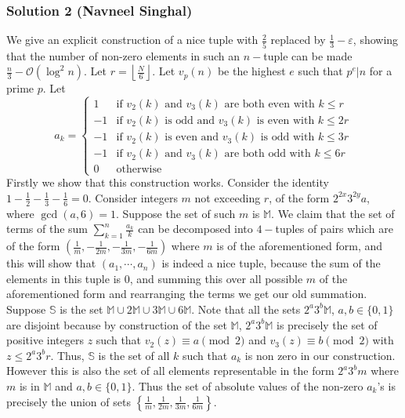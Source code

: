 \subsubsection{Solution 2 (Navneel Singhal)}
We give an explicit construction of a nice tuple with $\frac 25$ replaced by $\frac13 - \varepsilon$, showing that the number of non-zero elements in such an $n-$tuple can be made $\frac{n}{3} - \mathcal{O}(\log^2 n)$.
Let $r = \left\lfloor \frac{N}{6}\right\rfloor$. Let $v_p(n)$ be the highest $e$ such that $p^e | n$ for a prime $p$. Let
$$
a_k = 
\begin{cases}
    1 & \text{if } v_2(k) \text{ and } v_3(k) \text{ are both even with } k \le r\\
    -1 & \text{if } v_2(k) \text{ is odd and } v_3(k) \text{ is even with } k \le 2r\\
    -1 & \text{if } v_2(k) \text{ is even and } v_3(k) \text{ is odd with } k \le 3r\\
    -1 & \text{if } v_2(k) \text{ and } v_3(k) \text{ are both odd with } k \le 6r\\
    0 & \text{otherwise}
\end{cases}
$$
Firstly we show that this construction works.
Consider the identity $1 - \frac12 - \frac13 - \frac16 = 0$. Consider integers $m$ not exceeding $r$, of the form $2^{2x}3^{2y}a$, where $\gcd(a, 6) = 1$. Suppose the set of such $m$ is $\mathbb{M}$.
We claim that the set of terms of the sum $\sum_{k=1}^n \frac{a_k}{k}$ can be decomposed into $4-$tuples of pairs which are of the form $\left(\frac{1}{m}, -\frac{1}{2m}, -\frac{1}{3m}, -\frac{1}{6m} \right)$ where $m$ is of the aforementioned form, and this will show that $(a_1, \cdots, a_n)$ is indeed a nice tuple, because the sum of the elements in this tuple is $0$, and summing this over all possible $m$ of the aforementioned form and rearranging the terms we get our old summation.
\nl
Suppose $\mathbb{S}$ is the set $\mathbb{M} \cup 2\mathbb{M} \cup 3\mathbb{M} \cup 6\mathbb{M}$.
Note that all the sets $2^a3^b \mathbb{M}$, $a, b \in \{0, 1\}$ are disjoint because by construction of the set $\mathbb{M}$, $2^a3^b \mathbb{M}$ is precisely the set of positive integers $z$ such that $v_2(z) \equiv a \pmod 2$ and $v_3(z) \equiv b \pmod 2$ with $z \le 2^a3^b r$.
Thus, $\mathbb{S}$ is the set of all $k$ such that $a_k$ is non zero in our construction.
However this is also the set of all elements representable in the form $2^a 3^b m$ where $m$ is in $\mathbb{M}$ and $a, b \in \{0, 1\}$.
Thus the set of absolute values of the non-zero $a_k$'s is precisely the union of sets $\left\{\frac{1}{m}, \frac{1}{2m}, \frac{1}{3m}, \frac{1}{6m} \right\}$.\nl
